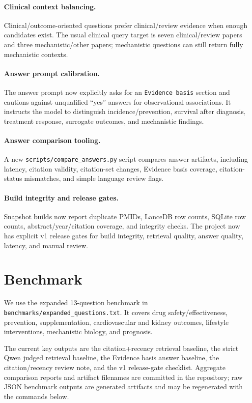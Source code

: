 \documentclass{article}
\begin{document}
\paragraph{Clinical context balancing.} Clinical/outcome-oriented questions prefer clinical/review evidence when enough candidates exist. The usual clinical query target is seven clinical/review papers and three mechanistic/other papers; mechanistic questions can still return fully mechanistic contexts.

\paragraph{Answer prompt calibration.} The answer prompt now explicitly asks for an \texttt{Evidence basis} section and cautions against unqualified ``yes'' answers for observational associations. It instructs the model to distinguish incidence/prevention, survival after diagnosis, treatment response, surrogate outcomes, and mechanistic findings.

\paragraph{Answer comparison tooling.} A new \texttt{scripts/compare\_answers.py} script compares answer artifacts, including latency, citation validity, citation-set changes, Evidence basis coverage, citation-status mismatches, and simple language review flags.

\paragraph{Build integrity and release gates.} Snapshot builds now report duplicate PMIDs, LanceDB row counts, SQLite row counts, abstract/year/citation coverage, and integrity checks. The project now has explicit v1 release gates for build integrity, retrieval quality, answer quality, latency, and manual review.

\section{Benchmark}

We use the expanded 13-question benchmark in \texttt{benchmarks/expanded\_questions.txt}. It covers drug safety/effectiveness, prevention, supplementation, cardiovascular and kidney outcomes, lifestyle interventions, mechanistic biology, and prognosis.

The current key outputs are the citation+recency retrieval baseline, the strict Qwen judged retrieval baseline, the Evidence basis answer baseline, the citation/recency review note, and the v1 release-gate checklist. Aggregate comparison reports and artifact filenames are committed in the repository; raw JSON benchmark outputs are generated artifacts and may be regenerated with the commands below.
\end{document}
